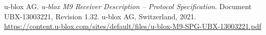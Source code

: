 \documentclass[../DoAn.tex]{subfiles}
\begin{document}
\begin{thebibliography}{9}
u-blox AG. \textit{u-blox M9 Receiver Description – Protocol Specification}. Document UBX-13003221, Revision 1.32. u-blox AG, Switzerland, 2021.\\
\url{https://content.u-blox.com/sites/default/files/u-blox-M9-SPG-UBX-13003221.pdf}
\end{thebibliography}
\end{document}
